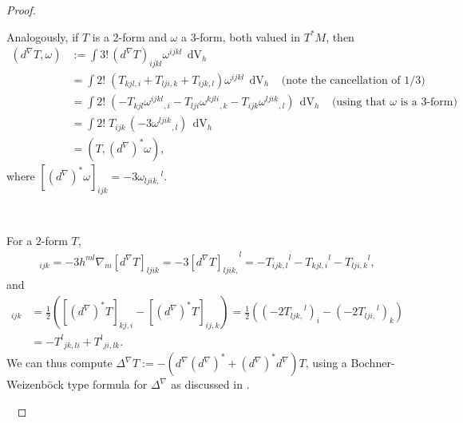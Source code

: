 \documentclass[10pt,reqno]{amsart}
\DeclareMathOperator{\dvol}{dV}
\begin{document}
\begin{proof}
\
	
Analogously, if $T$ is a $2$-form and $\omega$ a $3$-form, both valued in $T^*M$, then 
\begin{align*}
(d^\nabla T, \omega) &:= \int 3! \, (d^\nabla T)_{ijkl} \omega^{ijkl} \, \dvol_h \\
&= \int 2! \; ( T_{kjl,i} + T_{lji,k} + T_{ijk,l} )   \omega^{ijkl} \, \dvol_h \; \; \; \mbox{(note the cancellation of 1/3)}\\
&= \int 2! \; ( -T_{kjl}  {\omega^{ijkl}}_{,i}- T_{lji}{\omega^{kjli}}_{,k}  - T_{ijk}  {\omega^{ljik}}_{,l} ) \, \dvol_h\; \; \; \mbox{(using that $\omega$ is a 3-form)} \\
&= \int 2! \; T_{ijk} \, (-3 {\omega^{ljik}}_{,l} ) \, \dvol_h\\ 
&= ( T, (d^\nabla) ^* \omega),
\end{align*}
where $[(d^\nabla)^* \omega]_{ijk} = - 3 {\omega_{ljik,}}^l$.
	
\
	
For a $2$-form $T$, 
\begin{align*}
[(d^\nabla)^* d^\nabla T]_{ijk} = - 3 h^{ml} \nabla_m [d^\nabla T]_{ljik} = -3 [d^\nabla T]_{ljik,}^{\phantom{ljik,}l} = - {T_{ijk,l}}^l - {T_{kjl,i}}^l- {T_{lji,k}}^l,
\end{align*}  
and 
\begin{align*}
[d^\nabla (d^\nabla)^* T]_{ijk} & = \frac{1}{2} ( [(d^\nabla)^* T]_{kj,i} - [(d^\nabla)^* T]_{ij,k} ) = \frac{1}{2} ( (- 2 {T_{ljk,}}^l)_i - (- 2 {T_{lji,}}^l )_{k} )  \nonumber\\
& =  - {T^l}_{jk,li} +  {T^l}_{ji,lk}. 
\end{align*}
We can thus compute $\Delta^\nabla T := -(d^\nabla (d^\nabla)^*+  (d^\nabla)^* d^\nabla) T$, using a Bochner-Weizenb\"ock type formula for $\Delta^\nabla$ as discussed in \cite{CLN}.  

\ 


\end{proof}
\end{document}
